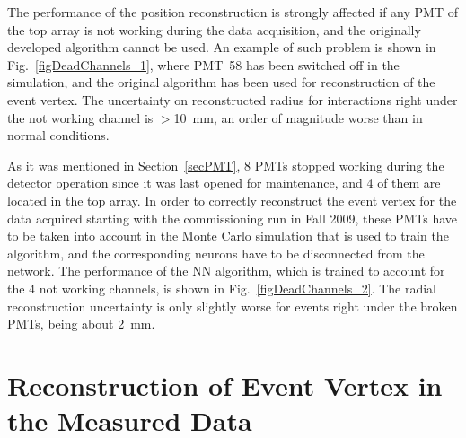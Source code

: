 
The performance of the position reconstruction is strongly affected if any PMT of the top array is not working during the data acquisition, and the  originally developed algorithm cannot be used. An example of such problem is shown in Fig.~\ref{figDeadChannels_1}, where PMT~58 has been switched off in the simulation, and the original algorithm has been used for reconstruction of the event vertex. The uncertainty on reconstructed radius for interactions right under the not working channel is $>$10~mm, an order of magnitude worse than in normal conditions.

As it was mentioned in Section~\ref{secPMT}, 8 PMTs stopped working during the detector operation since it was last opened for maintenance, and 4 of them are located in the top array. In order to correctly reconstruct the event vertex for the data acquired starting with the commissioning run in Fall 2009, these PMTs have to be taken into account in the Monte Carlo simulation that is used to train the algorithm, and the corresponding neurons have to be disconnected from the network. The performance of the NN algorithm, which is trained to account for the 4 not working channels, is shown in Fig.~\ref{figDeadChannels_2}. The radial reconstruction uncertainty is only slightly worse for events right under the broken PMTs, being about 2~mm.


\section{Reconstruction of Event Vertex in the Measured Data}
\label{secNNdata}

